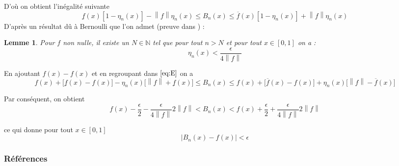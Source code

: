 \documentclass[
	10pt, %
	xcolor={svgnames}
]{beamer}
\newtheorem{lemme}[subsubsection]{Lemme}
\begin{document}
\begin{frame}
	D'où on obtient l'inégalité suivante 
	\begin{equation}
		\underline{f}(x)[1 - \eta_n(x)] - {\left\lVert f \right\rVert} \eta_n(x)
		\leq B_n(x) \leq \overline{f}(x)[1-\eta_n(x)] + {\left\lVert f \right\rVert} \eta_n(x) \label{eq:E}
	\end{equation}
	D'après un résultat dû à Bernoulli que l'on admet (preuve dans \cite{pinkus2000approximation}) :
	\begin{lemme}
	Pour \( f \) non nulle, il existe un \( N \in \mathbb{N} \) tel que pour tout \( n > N \) et pour tout \( x \in [0,1] \) on a :
	\begin{equation}
		\eta_n(x) < \frac{\epsilon}{4 {\left\lVert f \right\rVert}} 
	\end{equation}
	\end{lemme}
	En ajoutant \( f(x) - f(x) \) et en regroupant dans \( \eqref{eq:E} \) on a
	{\footnotesize
	\begin{equation*}
	f(x) + \lbrack \underline{f}(x)-f(x)\rbrack - 
		\eta_n(x) \lbrack {\left\lVert f \right\rVert} + \underline{f}(x)\rbrack 
		\leq B_n(x) \leq f(x) + \lbrack \overline{f}(x) - f(x) \rbrack 
	+ \eta_n(x) \lbrack {\left\lVert f \right\rVert}-\overline{f}(x) \rbrack
	\end{equation*}
	}

	Par conséquent, on obtient
	\begin{equation*}
		f(x)-\frac{\epsilon}{2} - 
		\frac{\epsilon}{4 {\left\lVert f \right\rVert}} 2{\left\lVert f \right\rVert}
		< B_n(x) < f(x) + \frac{\epsilon}{2}+\frac{\epsilon}{4 {\left\lVert f \right\rVert}} 2{\left\lVert f \right\rVert}
	\end{equation*}

	ce qui donne pour tout \( x \in [0,1] \)
	\begin{equation*}
		{\left\lvert B_n(x) - f(x) \right\rvert} < \epsilon
	\end{equation*}
	\end{frame}
\begin{frame} %
	\frametitle{Références}	
	\printbibliography

\end{frame}
\end{document}
